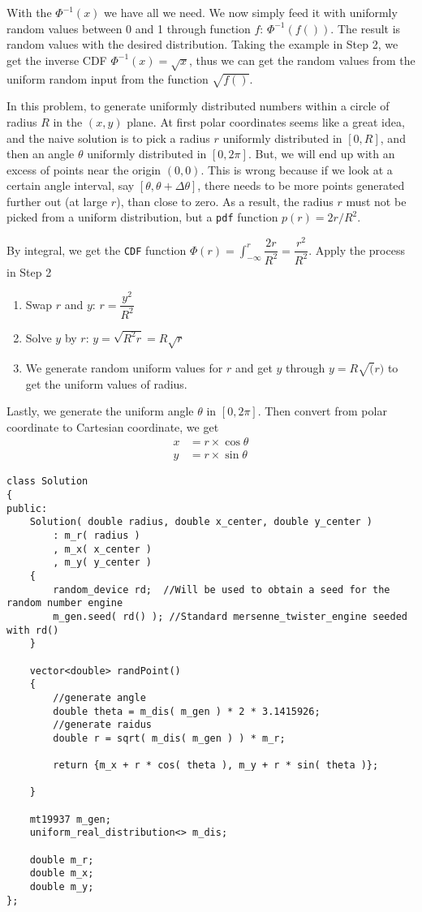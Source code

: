With the $\Phi^{-1}(x)$ we have all we need. We now simply feed it with uniformly random values between 0 and 1 through function $f$: $\Phi^{-1}(f())$. The result is random values with the desired distribution. Taking the example in Step 2, we get the inverse CDF $\Phi^{-1}(x) = \sqrt{x}$, thus we can get the random values from the uniform random input from the function $\sqrt{f()}$.

In this problem, to generate uniformly distributed numbers within a circle of radius $R$ in the $(x,y)$ plane. At first polar coordinates seems like a great idea, and the naive solution is to pick a radius $r$ uniformly distributed in $[0, R]$, and then an angle $\theta$ uniformly distributed in $[0, 2\pi]$. But, we will end up with an excess of points near the origin $(0, 0)$.  This is wrong because if we look at a certain angle interval, say $[\theta, \theta+\Delta\theta]$, there needs to be more points generated further out (at large $r$), than close to zero. As a result, the radius $r$ must not be picked from a uniform distribution, but a \texttt{pdf} function $p(r) = 2r/R^2$.

By integral, we get the \texttt{CDF} function $\Phi(r) = \int_{-\infty}^{r}\dfrac{2r}{R^2} = \dfrac{r^2}{R^2}$. Apply the process in Step 2
\begin{enumerate}
\item Swap $r$ and $y$: $r=\dfrac{y^2}{R^2}$
\item Solve $y$ by $r$: $y=\sqrt{R^2 r}=R\sqrt{r}$
\item We generate random uniform values for $r$ and get $y$ through $y=R\sqrt(r)$ to get the uniform values of radius.
\end{enumerate}

Lastly, we generate the uniform angle $\theta$ in $[0, 2\pi]$. Then convert from polar coordinate to Cartesian coordinate, we get
\begin{align*}
x &= r\times \cos\theta\\
y &= r\times \sin\theta
\end{align*}


\setcounter{lstlisting}{0}
\begin{lstlisting}[style=customc, caption={Inverse Transform}]
class Solution
{
public:
    Solution( double radius, double x_center, double y_center )
        : m_r( radius )
        , m_x( x_center )
        , m_y( y_center )
    {
        random_device rd;  //Will be used to obtain a seed for the random number engine
        m_gen.seed( rd() ); //Standard mersenne_twister_engine seeded with rd()
    }

    vector<double> randPoint()
    {
        //generate angle
        double theta = m_dis( m_gen ) * 2 * 3.1415926;
        //generate raidus
        double r = sqrt( m_dis( m_gen ) ) * m_r;

        return {m_x + r * cos( theta ), m_y + r * sin( theta )};

    }

    mt19937 m_gen;
    uniform_real_distribution<> m_dis;

    double m_r;
    double m_x;
    double m_y;
};
\end{lstlisting}
